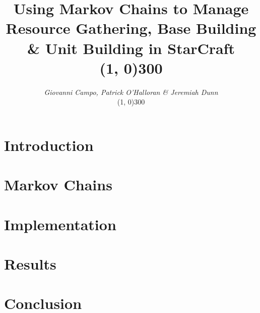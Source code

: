 \documentclass[12pt]{article}
\title{Using Markov Chains to Manage Resource Gathering, Base Building \& Unit Building in StarCraft\hspace{4cm}\\
\line(1, 0){300}
}
\author
{\textit{Giovanni Campo, Patrick O'Halloran \& Jeremiah Dunn}\vspace{0.3cm}\\\vspace{0.2cm}\line(1, 0){300}}
\date{}
\newenvironment{sciabstract}{%
\begin{quote} \bf}
{\end{quote}}
\begin{document}
 

\baselineskip24pt


\maketitle 




\begin{sciabstract}
 	
\end{sciabstract}


\section{Introduction}




\section{Markov Chains}




\section{Implementation}




\section{Results}




\section{Conclusion}





\newpage


\label{endpage}
\end{document}
